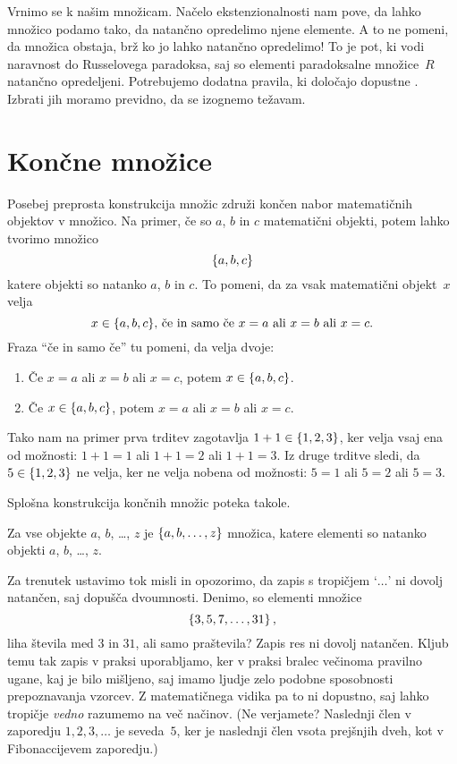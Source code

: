 Vrnimo se k našim množicam. Načelo ekstenzionalnosti nam pove, da lahko množico podamo
tako, da natančno opredelimo njene elemente. A to ne pomeni, da množica obstaja, brž ko jo
lahko natančno opredelimo! To je pot, ki vodi naravnost do Russelovega paradoksa, saj so
elementi paradoksalne množice~$R$ natančno opredeljeni. Potrebujemo dodatna pravila, ki
določajo dopustne . Izbrati jih moramo previdno, da se izognemo
težavam.

\section{Končne množice}
\label{sec:koncne-mnozice}

Posebej preprosta konstrukcija množic združi končen nabor matematičnih objektov v množico.
Na primer, če so $a$, $b$ in $c$ matematični objekti, potem lahko tvorimo množico
%
\begin{equation*}
  \set{a, b, c}
\end{equation*}
%
katere objekti so natanko $a$, $b$ in $c$. To pomeni, da za vsak matematični objekt~$x$
velja
%
\begin{equation*}
  \text{$x \in \set{a, b, c}$, če in samo če $x = a$ ali $x = b$ ali $x = c$.}
\end{equation*}
%
Fraza ``če in samo če'' tu pomeni, da velja dvoje:
%
\begin{enumerate}
\item Če $x = a$ ali $x = b$ ali $x = c$, potem $x \in \set{a, b, c}$.
\item Če $x \in \set{a, b, c}$, potem $x = a$ ali $x = b$ ali $x = c$.
\end{enumerate}
%
Tako nam na primer prva trditev zagotavlja $1+1 \in \set{1, 2, 3}$, ker velja
vsaj ena od možnosti: $1 + 1 = 1$ ali $1 + 1 = 2$ ali $1 + 1 = 3$. Iz druge trditve sledi, da
$5 \in \set{1, 2, 3}$ ne velja, ker ne velja nobena od možnosti: $5 = 1$ ali $5 = 2$ ali
$5 = 3$.

Splošna konstrukcija končnih množic poteka takole.

\begin{pravilo}
  \label{pravilo:koncna-mnozica}
  Za vse objekte $a$, $b$, \dots, $z$ je $\set{a, b, \ldots, z}$ množica, katere elementi
  so natanko objekti $a$, $b$, \dots, $z$.
\end{pravilo}

Za trenutek ustavimo tok misli in opozorimo, da zapis s tropičjem `$\ldots$' ni dovolj
natančen, saj dopušča dvoumnosti. Denimo, so elementi množice
%
\begin{equation*}
  \set{3, 5, 7, \ldots, 31},
\end{equation*}
%
liha števila med $3$ in $31$, ali samo praštevila? Zapis res ni dovolj natančen. Kljub
temu tak zapis v praksi uporabljamo, ker v praksi bralec večinoma pravilno ugane, kaj je
bilo mišljeno, saj imamo ljudje zelo podobne sposobnosti prepoznavanja vzorcev. Z
matematičnega vidika pa to ni dopustno, saj lahko tropičje \emph{vedno} razumemo na več
načinov. (Ne verjamete? Naslednji člen v zaporedju $1, 2, 3, \ldots$ je seveda~$5$, ker je
naslednji člen vsota prejšnjih dveh, kot v Fibonaccijevem zaporedju.)

